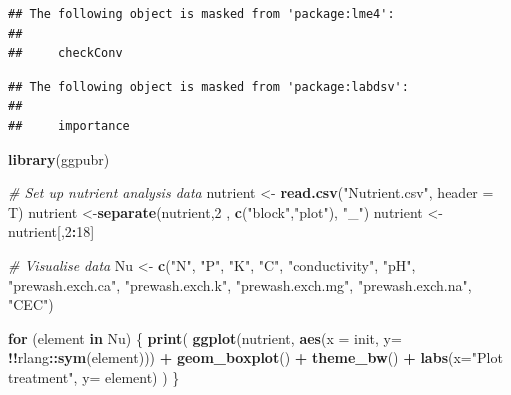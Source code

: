 \documentclass[
]{article}
\newenvironment{Shaded}{\begin{snugshade}}{\end{snugshade}}
\newcommand{\AttributeTok}[1]{\textcolor[rgb]{0.13,0.29,0.53}{#1}}
\newcommand{\CommentTok}[1]{\textcolor[rgb]{0.56,0.35,0.01}{\textit{#1}}}
\newcommand{\ControlFlowTok}[1]{\textcolor[rgb]{0.13,0.29,0.53}{\textbf{#1}}}
\newcommand{\DecValTok}[1]{\textcolor[rgb]{0.00,0.00,0.81}{#1}}
\newcommand{\FunctionTok}[1]{\textcolor[rgb]{0.13,0.29,0.53}{\textbf{#1}}}
\newcommand{\NormalTok}[1]{#1}
\newcommand{\OtherTok}[1]{\textcolor[rgb]{0.56,0.35,0.01}{#1}}
\newcommand{\SpecialCharTok}[1]{\textcolor[rgb]{0.81,0.36,0.00}{\textbf{#1}}}
\newcommand{\StringTok}[1]{\textcolor[rgb]{0.31,0.60,0.02}{#1}}
\begin{document}
\begin{verbatim}
## The following object is masked from 'package:lme4':
## 
##     checkConv
\end{verbatim}

\begin{verbatim}
## The following object is masked from 'package:labdsv':
## 
##     importance
\end{verbatim}

\begin{Shaded}
\begin{Highlighting}[]
\FunctionTok{library}\NormalTok{(ggpubr)}

\CommentTok{\# Set up nutrient analysis data}
\NormalTok{nutrient }\OtherTok{\textless{}{-}} \FunctionTok{read.csv}\NormalTok{(}\StringTok{"Nutrient.csv"}\NormalTok{, }\AttributeTok{header =}\NormalTok{ T)}
\NormalTok{nutrient }\OtherTok{\textless{}{-}}\FunctionTok{separate}\NormalTok{(nutrient,}\DecValTok{2}\NormalTok{ , }\FunctionTok{c}\NormalTok{(}\StringTok{"block"}\NormalTok{,}\StringTok{"plot"}\NormalTok{), }\StringTok{"\_"}\NormalTok{)}
\NormalTok{nutrient }\OtherTok{\textless{}{-}}\NormalTok{ nutrient[,}\DecValTok{2}\SpecialCharTok{:}\DecValTok{18}\NormalTok{]}

\CommentTok{\# Visualise data}
\NormalTok{Nu }\OtherTok{\textless{}{-}} \FunctionTok{c}\NormalTok{(}\StringTok{"N"}\NormalTok{, }\StringTok{"P"}\NormalTok{, }\StringTok{"K"}\NormalTok{, }\StringTok{"C"}\NormalTok{, }\StringTok{"conductivity"}\NormalTok{, }\StringTok{"pH"}\NormalTok{, }\StringTok{"prewash.exch.ca"}\NormalTok{, }\StringTok{"prewash.exch.k"}\NormalTok{, }\StringTok{"prewash.exch.mg"}\NormalTok{, }\StringTok{"prewash.exch.na"}\NormalTok{, }\StringTok{"CEC"}\NormalTok{)}

\ControlFlowTok{for}\NormalTok{ (element }\ControlFlowTok{in}\NormalTok{ Nu) \{}
    \FunctionTok{print}\NormalTok{(}
      \FunctionTok{ggplot}\NormalTok{(nutrient, }\FunctionTok{aes}\NormalTok{(}\AttributeTok{x =}\NormalTok{ init, }\AttributeTok{y=} \SpecialCharTok{!!}\NormalTok{rlang}\SpecialCharTok{::}\FunctionTok{sym}\NormalTok{(element))) }\SpecialCharTok{+}
      \FunctionTok{geom\_boxplot}\NormalTok{() }\SpecialCharTok{+} 
      \FunctionTok{theme\_bw}\NormalTok{() }\SpecialCharTok{+}
      \FunctionTok{labs}\NormalTok{(}\AttributeTok{x=}\StringTok{"Plot treatment"}\NormalTok{, }\AttributeTok{y=}\NormalTok{ element)}
\NormalTok{    )}
\NormalTok{\}}
\end{Highlighting}
\end{Shaded}
\end{document}
